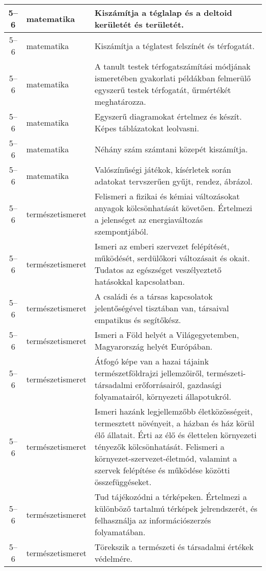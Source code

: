 \begin{small}
\begin{longtable}{c | p{2cm} |  p{11cm} }
              5--6 & matematika & Kiszámítja a téglalap és a deltoid kerületét és területét.
 \\ \hline
              5--6 & matematika & Kiszámítja a téglatest felszínét és térfogatát. \\ \hline
              5--6 & matematika & A tanult testek térfogatszámítási módjának ismeretében gyakorlati példákban felmerülő egyszerű testek térfogatát, űrmértékét meghatározza. \\ \hline
              5--6 & matematika & Egyszerű diagramokat értelmez és  készít. Képes táblázatokat leolvasni.
 \\ \hline
              5--6 & matematika & Néhány szám számtani közepét kiszámítja. \\ \hline
              5--6 & matematika & Valószínűségi játékok, kísérletek során adatokat tervszerűen gyűjt, rendez, ábrázol. \\ \hline
              5--6 & természetismeret & Felismeri a fizikai és kémiai változásokat anyagok kölcsönhatását követően. Értelmezi a jelenséget az energiaváltozás szempontjából. \\ \hline
              5--6 & természetismeret & Ismeri az emberi szervezet felépítését, működését, serdülőkori változásait és okait. Tudatos az egészséget veszélyeztető hatásokkal kapcsolatban. \\ \hline
              5--6 & természetismeret & A családi és a társas kapcsolatok jelentőségével tisztában van, társaival empatikus és segítőkész. \\ \hline
              5--6 & természetismeret & Ismeri a Föld helyét a Világegyetemben, Magyarország helyét Európában. \\ \hline
              5--6 & természetismeret & Átfogó képe van a hazai tájaink természetföldrajzi jellemzőiről, természeti-társadalmi erőforrásairól, gazdasági folyamatairól, környezeti állapotukról. \\ \hline
              5--6 & természetismeret & Ismeri hazánk legjellemzőbb életközösségeit, termesztett növényeit, a házban és ház körül élő állatait. Érti az élő és élettelen környezeti tényezők kölcsönhatását. Felismeri a környezet-szervezet-életmód, valamint a szervek felépítése és működése közötti összefüggéseket. \\ \hline
              5--6 & természetismeret & Tud tájékozódni a térképeken. Értelmezi a különböző tartalmú térképek jelrendszerét, és felhasználja az információszerzés folyamatában. \\ \hline
              5--6 & természetismeret & Törekszik a természeti és társadalmi értékek védelmére. \\ \hline

\end{longtable}
\end{small}
